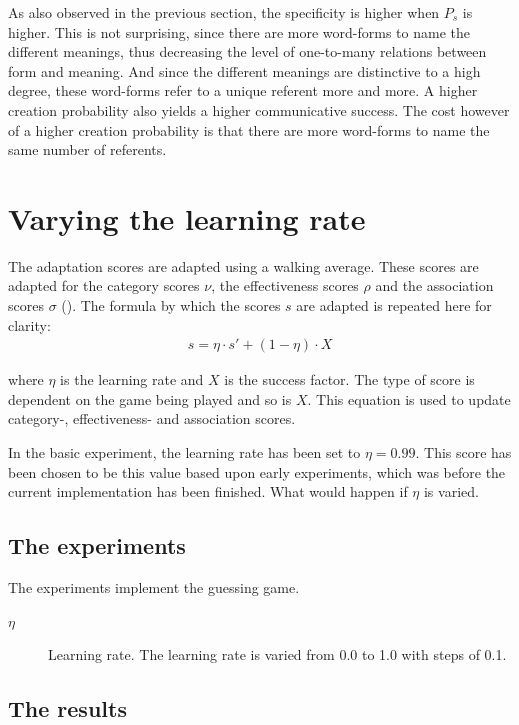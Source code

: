 As also observed in the previous section, the specificity is higher when $P_s$ is higher. This is not surprising, since there are more word-forms to name the different meanings, thus decreasing the level of one-to-many relations between form and meaning. And since the different meanings are distinctive to a high degree, these word-forms refer to a unique referent more and more. A higher creation probability also yields a higher communicative success. The cost however of a higher creation probability is that there are more word-forms to name the same number of referents.

\section{Varying the learning rate}\label{s:par:lr}

The adaptation scores are adapted using a walking average. These scores are adapted for the category scores $\nu$, the effectiveness scores $\rho$ and the association scores $\sigma$ (). The formula by which the scores $s$ are adapted is repeated here for clarity:
\begin{eqnarray}
s = \eta \cdot s' + (1-\eta)\cdot X
\end{eqnarray}


where $\eta$ is the learning rate and $X$ is the success factor. The type of score is dependent on the game being played and so is $X$. This equation is used to update category-, effectiveness- and association scores.

In the basic experiment, the learning rate has been set to $\eta=0.99$. This score has been chosen to be this value based upon early experiments, which was before the current implementation has been finished. What would happen if $\eta$ is varied.

\subsection{The experiments}

The experiments implement the guessing game.

\begin{description}
\item[$\eta$] Learning rate. The learning rate is varied from 0.0 to 1.0 with steps of 0.1.
\end{description}

\subsection{The results}

